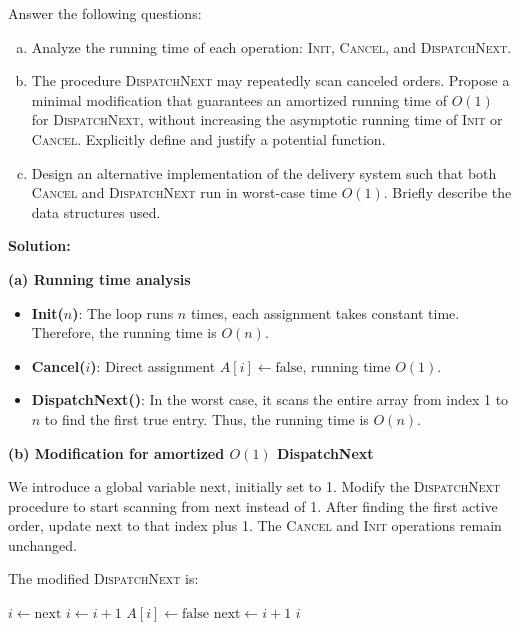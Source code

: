 \bigskip

\noindent Answer the following questions:

\begin{enumerate}[(a)]
  \item Analyze the running time of each operation:
        \textsc{Init}, \textsc{Cancel}, and \textsc{DispatchNext}.
  \item The procedure \textsc{DispatchNext} may repeatedly scan canceled orders.
        Propose a minimal modification that guarantees
        an amortized running time of $O(1)$ for \textsc{DispatchNext},
        without increasing the asymptotic running time of
        \textsc{Init} or \textsc{Cancel}.
        Explicitly define and justify a potential function.
  \item Design an alternative implementation of the delivery system
        such that both \textsc{Cancel} and \textsc{DispatchNext}
        run in worst-case time $O(1)$.
        Briefly describe the data structures used.
\end{enumerate}



\textbf{Solution:}

\textbf{(a) Running time analysis}

\begin{itemize}
    \item \textbf{Init($n$)}: The loop runs $n$ times, each assignment takes constant time. Therefore, the running time is $O(n)$.
    \item \textbf{Cancel($i$)}: Direct assignment $A[i] \leftarrow \text{false}$, running time $O(1)$.
    \item \textbf{DispatchNext()}: In the worst case, it scans the entire array from index 1 to $n$ to find the first $\text{true}$ entry. Thus, the running time is $O(n)$.
\end{itemize}

\textbf{(b) Modification for amortized $O(1)$ DispatchNext}

We introduce a global variable $\text{next}$, initially set to 1. Modify the \textsc{DispatchNext} procedure to start scanning from $\text{next}$ instead of 1. After finding the first active order, update $\text{next}$ to that index plus 1. The \textsc{Cancel} and \textsc{Init} operations remain unchanged.

The modified \textsc{DispatchNext} is:

\begin{algorithm}[H]
\caption{Modified DispatchNext}
\begin{algorithmic}[1]
    \State $i \gets \text{next}$
        \State $i \gets i + 1$
    \EndWhile
        \State $A[i] \gets \text{false}$
        \State $\text{next} \gets i + 1$
        \State \Return $i$
    \Else
        \State {}
    \EndIf
\EndProcedure
\end{algorithmic}
\end{algorithm}

